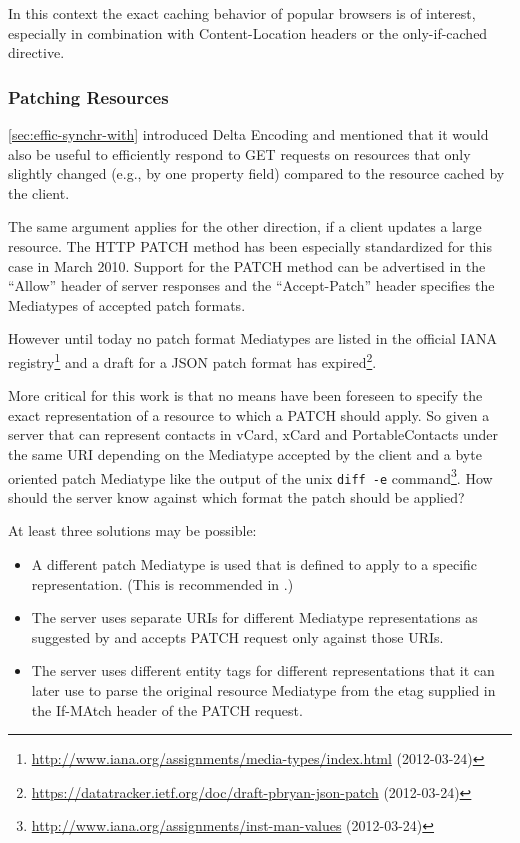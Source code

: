 \documentclass[12pt,a4paper,twoside]{scrartcl}		%
\newcommand{\citeurl}[2]{\url{#1} (#2)}
\begin{document}
In this context the exact caching behavior of popular browsers is of interest,
especially in combination with Content-Location headers or the only-if-cached
directive.

\subsubsection{Patching Resources}
\label{sec:patching-resources}

\autoref{sec:effic-synchr-with} introduced Delta Encoding\cite{RFC3229} and
mentioned that it would also be useful to efficiently respond to GET requests on
resources that only slightly changed (e.g., by one property field) compared to
the resource cached by the client.

The same argument applies for the other direction, if a client updates a large
resource. The HTTP PATCH method\cite{RFC5789} has been especially standardized
for this case in March 2010. Support for the PATCH method can be advertised in
the ``Allow'' header of server responses and the ``Accept-Patch'' header
specifies the Mediatypes of accepted patch formats.

However until today no patch format Mediatypes are listed in the official IANA
registry\footnote{\citeurl{http://www.iana.org/assignments/media-types/index.html}{2012-03-24}}
and a draft for a JSON patch format has
expired\footnote{\citeurl{https://datatracker.ietf.org/doc/draft-pbryan-json-patch}{2012-03-24}}.

More critical for this work is that no means have been foreseen to specify the
exact representation of a resource to which a PATCH should apply. So given a
server that can represent contacts in vCard, xCard and PortableContacts under
the same URI depending on the Mediatype accepted by the client and a byte
oriented patch Mediatype like the output of the unix \lstinline:diff -e:
command\footnote{\citeurl{http://www.iana.org/assignments/inst-man-values}{2012-03-24}}. How
should the server know against which format the patch should be applied?

At least three solutions may be possible:
\begin{itemize}
\item A different patch Mediatype is used that is defined to apply to a specific
  representation. (This is recommended in \cite[ch. 11.9]{Allamaraju_2010}.)
\item The server uses separate URIs for different Mediatype representations as
  suggested by \cite{Raman2006} and accepts PATCH request only against those
  URIs.
\item The server uses different entity tags for different representations that it can later use to parse the original resource Mediatype from the etag supplied in the If-MAtch header of the PATCH request.
\end{itemize}
\end{document}
